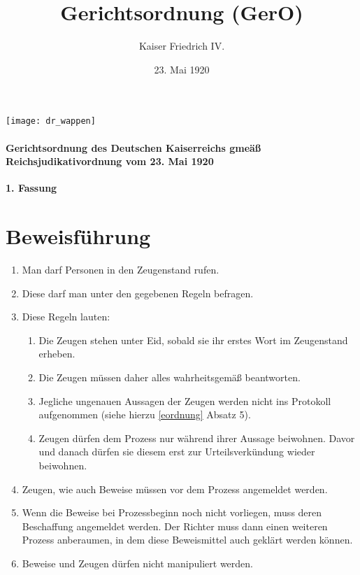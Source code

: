 \documentclass{article}
\title{Gerichtsordnung (GerO)}
\author{Kaiser Friedrich IV.}
\date{23. Mai 1920}
\begin{document}
\maketitle
\begin{center}
    \texttt{[image: dr\_wappen]}
\end{center}
\vspace*{\fill}
\paragraph{Gerichtsordnung des Deutschen Kaiserreichs gmeäß Reichsjudikativordnung vom 23. Mai 1920}

\newpage
{}
\vspace*{\fill}
\begin{Center}
\textbf{1. Fassung}
\vspace*{\fill}
\end{Center}
\newpage
\tableofcontents
\newpage
\section{Beweisführung}\label{zeugen}
\begin{enumerate}[(1)]
    \item Man darf Personen in den Zeugenstand rufen.
    \item Diese darf man unter den gegebenen Regeln befragen.
    \item Diese Regeln lauten:
        \begin{enumerate}[1.]
            \item Die Zeugen stehen unter Eid, sobald sie ihr erstes Wort im Zeugenstand erheben.
            \item Die Zeugen müssen daher alles wahrheitsgemäß beantworten.
            \item Jegliche ungenauen Aussagen der Zeugen werden nicht ins Protokoll aufgenommen (siehe hierzu \ref{eordnung} Absatz 5).
            \item Zeugen dürfen dem Prozess nur während ihrer Aussage beiwohnen. Davor und danach dürfen sie diesem erst zur Urteilsverkündung wieder beiwohnen.
        \end{enumerate}
    \item Zeugen, wie auch Beweise müssen vor dem Prozess angemeldet werden.
    \item Wenn die Beweise bei Prozessbeginn noch nicht vorliegen, muss deren Beschaffung angemeldet werden. Der Richter muss dann einen weiteren Prozess anberaumen, in dem diese Beweismittel auch geklärt werden können.
    \item Beweise und Zeugen dürfen nicht manipuliert werden.
\end{enumerate}
\end{document}
